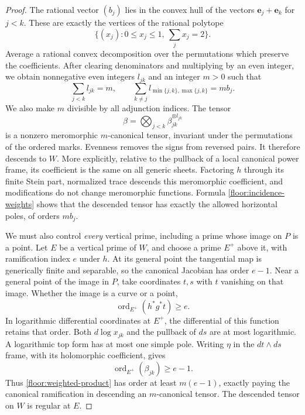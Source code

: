 \documentclass[11pt,letterpaper]{article}
\theoremstyle{definition}
\theoremstyle{remark}
\begin{document}
\begin{proof}
The rational vector $(b_j)$ lies in the convex hull of the vectors
$\mathbf e_j+\mathbf e_k$ for $j<k$.  These are exactly the
vertices of the rational polytope
\[
 \bigl\{(x_j):0\le x_j\le1,\ \sum_jx_j=2\bigr\}.
\]
Average a rational convex decomposition over the permutations
which preserve the coefficients.  After clearing denominators
and multiplying by an even integer, we obtain nonnegative even
integers $l_{jk}$ and an integer $m>0$ such that
\begin{equation}
 \label{floor:incidence-weights}
 \sum_{j<k}l_{jk}=m,\qquad
 \sum_{k\ne j}l_{\min\{j,k\},\max\{j,k\}}=mb_j.
\end{equation}
We also make $m$ divisible by all adjunction indices.  The tensor
\begin{equation}
 \label{floor:weighted-product}
 \beta=\bigotimes_{j<k}\beta_{jk}^{\otimes l_{jk}}
\end{equation}
is a nonzero meromorphic $m$-canonical tensor, invariant under
the permutations of the ordered marks.  Evenness removes the
signs from reversed pairs.  It therefore descends to $W$.
More explicitly, relative to the pullback of a local canonical
power frame, its coefficient is the same on all generic sheets.
Factoring $h$ through its finite Stein part, normalized trace
descends this meromorphic coefficient, and modifications do not
change meromorphic functions.  Formula
\eqref{floor:incidence-weights} shows that the descended tensor
has exactly the allowed horizontal poles, of orders $mb_j$.

We must also control \emph{every} vertical prime, including a
prime whose image on $P$ is a point.  Let $E$ be a vertical prime
of $W$, and choose a prime $E^+$ above it, with ramification index
$e$ under $h$.  At its general point the tangential map is
generically finite and separable, so the canonical Jacobian has
order $e-1$.  Near a general point of the image in $P$, take
coordinates $t,s$ with $t$ vanishing on that image.  Whether the
image is a curve or a point,
\[
 \operatorname{ord}_{E^+}(h^*g^*t)\ge e.
\]
In logarithmic differential coordinates at $E^+$, the
differential of this function retains that order.  Both
$d\log x_{jk}$ and the pullback of $ds$ are at most logarithmic.
A logarithmic top form has at most one simple pole.  Writing
$\eta$ in the $dt\wedge ds$ frame, with its holomorphic
coefficient, gives
\begin{equation}
 \label{floor:vertical-order}
 \operatorname{ord}_{E^+}(\beta_{jk})\ge e-1.
\end{equation}
Thus \eqref{floor:weighted-product} has order at least $m(e-1)$,
exactly paying the canonical ramification in descending an
$m$-canonical tensor.  The descended tensor on $W$ is regular at
$E$.


\end{proof}
\end{document}
